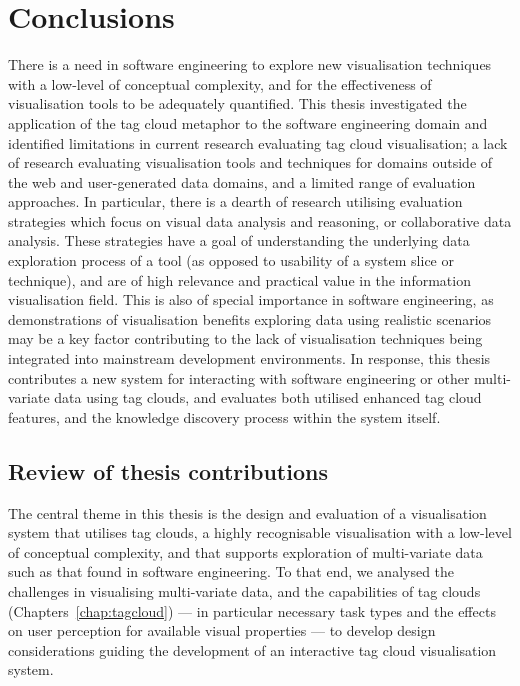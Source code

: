 \def\baselinestretch{1}
\chapter{Conclusions} \label{chap:conclusions}
\ifpdf
    \graphicspath{{Chapters/Conclusions/ConclusionsFigs/PNG/}{Chapters/Conclusions/ConclusionsFigs/PDF/}{Chapters/Conclusions/ConclusionsFigs/}}
\else
    \graphicspath{{Chapters/Conclusions/ConclusionsFigs/EPS/}{Chapters/Conclusions/ConclusionsFigs/}}
\fi

\def\baselinestretch{1.66}

There is a need in software engineering to explore new visualisation techniques with a low-level of conceptual complexity, and for the effectiveness of visualisation tools to be adequately quantified. This thesis investigated the application of the tag cloud metaphor to the software engineering domain and identified limitations in current research evaluating tag cloud visualisation; a lack of research evaluating visualisation tools and techniques for domains outside of the web and user-generated data domains, and a limited range of evaluation approaches. In particular, there is a dearth of research utilising evaluation strategies which focus on visual data analysis and reasoning, or collaborative data analysis. These strategies have a goal of understanding the underlying data exploration process of a tool (as opposed to usability of a system slice or technique), and are of high relevance and practical value in the information visualisation field. This is also of special importance in software engineering, as demonstrations of visualisation benefits exploring data using realistic scenarios may be a key factor contributing to the lack of visualisation techniques being integrated into mainstream development environments. In response, this thesis contributes a new system for interacting with software engineering or other multi-variate data using tag clouds, and evaluates both utilised enhanced tag cloud features, and the knowledge discovery process within the system itself. 

\section{Review of thesis contributions}

The central theme in this thesis is the design and evaluation of a visualisation system that utilises tag clouds, a highly recognisable visualisation with a low-level of conceptual complexity, and that supports exploration of multi-variate data such as that found in software engineering. To that end, we analysed the challenges in visualising multi-variate data, and the capabilities of tag clouds (Chapters~\ref{chap:tagcloud}) --- in particular necessary task types and the effects on user perception for available visual properties ---  to develop design considerations guiding the development of an interactive tag cloud visualisation system. 

